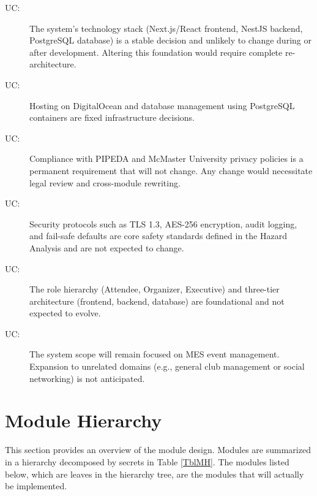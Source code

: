 \documentclass[12pt, titlepage]{article}
\newcounter{ucnum}
\newcommand{\uctheucnum}{UC\theucnum}
\begin{document}
\begin{description}

\item[ \uctheucnum \label{ucTechStack}:] 
The system's technology stack (Next.js/React frontend, NestJS backend, PostgreSQL database) 
is a stable decision and unlikely to change during or after development.
Altering this foundation would require complete re-architecture.

\item[ \uctheucnum \label{ucHosting}:] 
Hosting on DigitalOcean and database management using PostgreSQL containers 
are fixed infrastructure decisions.

\item[ \uctheucnum \label{ucPrivacy}:] 
Compliance with PIPEDA and McMaster University privacy policies is a permanent 
requirement that will not change. Any change would necessitate legal
review and cross-module rewriting.

\item[ \uctheucnum \label{ucRolesArch}:] 
Security protocols such as TLS 1.3, AES-256 encryption, audit logging, and 
fail-safe defaults are core safety standards defined in the Hazard Analysis
and are not expected to change.

\item[ \uctheucnum \label{ucRolesArch}:] 
The role hierarchy (Attendee, Organizer, Executive) and three-tier architecture 
(frontend, backend, database) are foundational and not expected to evolve.

\item[ \uctheucnum \label{ucScope}:] 
The system scope will remain focused on MES event management. Expansion to unrelated 
domains (e.g., general club management or social networking) is not anticipated.

\end{description}

\section{Module Hierarchy} \label{SecMH}

This section provides an overview of the module design. Modules are summarized
in a hierarchy decomposed by secrets in Table \ref{TblMH}. The modules listed
below, which are leaves in the hierarchy tree, are the modules that will
actually be implemented.
\end{document}
